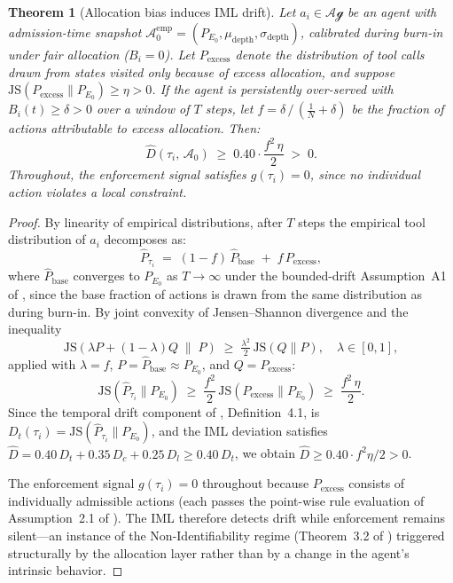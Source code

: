 \documentclass[11pt]{article}
\theoremstyle{plain}
\newtheorem{theorem}{Theorem}[section]
\theoremstyle{definition}
\theoremstyle{remark}
\newcommand{\Agents}{\mathcal{Ag}}         %
\begin{document}
\begin{theorem}[Allocation bias induces IML drift]
\label{thm:bias-drift}
Let $a_i \in \Agents$ be an agent with admission-time snapshot
$\mathcal{A}_0^{\mathrm{emp}} = (P_{E_0}, \mu_{\mathrm{depth}},
\sigma_{\mathrm{depth}})$, calibrated during burn-in under fair
allocation ($B_i = 0$).  Let $P_{\mathrm{excess}}$ denote the
distribution of tool calls drawn from states visited only because
of excess allocation, and suppose
$\mathrm{JS}(P_{\mathrm{excess}} \| P_{E_0}) \geq \eta > 0$.
If the agent is persistently over-served with $B_i(t) \geq \delta > 0$
over a window of $T$ steps, let
$f = \delta\,/\,(\tfrac{1}{N} + \delta)$
be the fraction of actions attributable to excess allocation.  Then:
\[
  \widehat{D}(\tau_i,\,\mathcal{A}_0)
  \;\geq\; 0.40 \cdot \frac{f^2\,\eta}{2} \;>\; 0.
\]
Throughout, the enforcement signal satisfies $g(\tau_i) = 0$, since
no individual action violates a local constraint.
\end{theorem}

\begin{proof}
By linearity of empirical distributions, after $T$ steps the empirical
tool distribution of $a_i$ decomposes as:
\[
  \hat{P}_{\tau_i}
  \;=\; (1 - f)\,\hat{P}_{\mathrm{base}} \;+\; f\,P_{\mathrm{excess}},
\]
where $\hat{P}_{\mathrm{base}}$ converges to $P_{E_0}$ as
$T \to \infty$ under the bounded-drift Assumption~A1 of
\citet{fernandez2026c}, since the base fraction of actions is drawn
from the same distribution as during burn-in.
By joint convexity of Jensen--Shannon divergence and the inequality
\[
  \mathrm{JS}(\lambda P + (1-\lambda)Q \;\|\; P)
  \;\geq\; \tfrac{\lambda^2}{2}\,\mathrm{JS}(Q \| P),
  \quad \lambda \in [0,1],
\]
applied with $\lambda = f$, $P = \hat{P}_{\mathrm{base}} \approx P_{E_0}$,
and $Q = P_{\mathrm{excess}}$:
\[
  \mathrm{JS}(\hat{P}_{\tau_i} \| P_{E_0})
  \;\geq\; \frac{f^2}{2}\,\mathrm{JS}(P_{\mathrm{excess}} \| P_{E_0})
  \;\geq\; \frac{f^2\,\eta}{2}.
\]
Since the temporal drift component of \citet{fernandez2026c},
Definition~4.1, is $D_t(\tau_i) = \mathrm{JS}(\hat{P}_{\tau_i}\|P_{E_0})$,
and the IML deviation satisfies
$\widehat{D} = 0.40\,D_t + 0.35\,D_c + 0.25\,D_l \geq 0.40\,D_t$,
we obtain $\widehat{D} \geq 0.40 \cdot f^2\eta/2 > 0$.

The enforcement signal $g(\tau_i) = 0$ throughout because
$P_{\mathrm{excess}}$ consists of individually admissible actions
(each passes the point-wise rule evaluation of Assumption~2.1 of
\citet{fernandez2026c}).  The IML therefore detects drift while
enforcement remains silent---an instance of the
Non-Identifiability regime (Theorem~3.2 of \citet{fernandez2026c})
triggered structurally by the allocation layer rather than by
a change in the agent's intrinsic behavior.
\end{proof}
\end{document}
